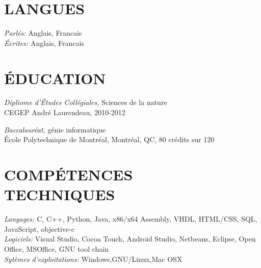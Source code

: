 \documentclass[margin, 10pt]{res} %
\begin{document}
\begin{resume}


\section{LANGUES}

{\sl Parl\'es:} Anglais, Francais \\
{\sl \'Ecrites:} Anglais, Francais


\section{\'EDUCATION}

{\sl Dipliome d'\'Etudes Coll\'egiales,} Sciences de la nature \\
CEGEP Andr\'e Laurendeau, 2010-2012 

{\sl Baccalaur\'eat,} g\'enie informatique \\
\'Ecole Polytechnique de Montr\'eal, Montr\'eal, QC, 80 cr\'edits sur 120 
 

\section{COMP\'ETENCES\\ TECHNIQUES} 

{\sl Langages:} 
C, C++, Python, Java, x86/x64 Assembly, VHDL, HTML/CSS, SQL, JavaScript, objective-c \\
{\sl Logiciels:} 
Visual Studio, Cocoa Touch, Android Studio, Netbeans, Eclipse, Open Office, MSOffice, GNU tool chain \\
{\sl Syt\`emes d'exploitations:} Windows,GNU/Linux,Mac OSX
 
 

\end{resume}
\end{document}
